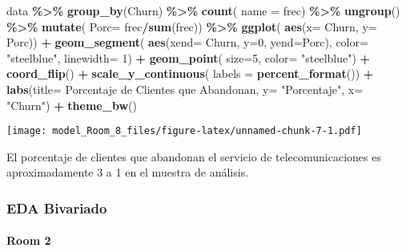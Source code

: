 \documentclass[
]{article}
\newenvironment{Shaded}{\begin{snugshade}}{\end{snugshade}}
\newcommand{\AttributeTok}[1]{\textcolor[rgb]{0.13,0.29,0.53}{#1}}
\newcommand{\DecValTok}[1]{\textcolor[rgb]{0.00,0.00,0.81}{#1}}
\newcommand{\FunctionTok}[1]{\textcolor[rgb]{0.13,0.29,0.53}{\textbf{#1}}}
\newcommand{\NormalTok}[1]{#1}
\newcommand{\SpecialCharTok}[1]{\textcolor[rgb]{0.81,0.36,0.00}{\textbf{#1}}}
\newcommand{\StringTok}[1]{\textcolor[rgb]{0.31,0.60,0.02}{#1}}
\begin{document}
\begin{Shaded}
\begin{Highlighting}[]
\NormalTok{data }\SpecialCharTok{\%\textgreater{}\%}
\FunctionTok{group\_by}\NormalTok{(Churn) }\SpecialCharTok{\%\textgreater{}\%}
\FunctionTok{count}\NormalTok{( }\AttributeTok{name =} \StringTok{\textquotesingle{}frec\textquotesingle{}}\NormalTok{) }\SpecialCharTok{\%\textgreater{}\%}
\FunctionTok{ungroup}\NormalTok{() }\SpecialCharTok{\%\textgreater{}\%}
\FunctionTok{mutate}\NormalTok{( }\AttributeTok{Porc=}\NormalTok{ frec}\SpecialCharTok{/}\FunctionTok{sum}\NormalTok{(frec)) }\SpecialCharTok{\%\textgreater{}\%}
\FunctionTok{ggplot}\NormalTok{( }\FunctionTok{aes}\NormalTok{(}\AttributeTok{x=}\NormalTok{ Churn, }\AttributeTok{y=}\NormalTok{ Porc)) }\SpecialCharTok{+}
\FunctionTok{geom\_segment}\NormalTok{( }\FunctionTok{aes}\NormalTok{(}\AttributeTok{xend=}\NormalTok{ Churn, }\AttributeTok{y=}\DecValTok{0}\NormalTok{, }\AttributeTok{yend=}\NormalTok{Porc),}
\AttributeTok{color=} \StringTok{"steelblue"}\NormalTok{, }\AttributeTok{linewidth=} \DecValTok{1}\NormalTok{) }\SpecialCharTok{+}
\FunctionTok{geom\_point}\NormalTok{( }\AttributeTok{size=}\DecValTok{5}\NormalTok{, }\AttributeTok{color=} \StringTok{"steelblue"}\NormalTok{) }\SpecialCharTok{+}
\FunctionTok{coord\_flip}\NormalTok{() }\SpecialCharTok{+}
\FunctionTok{scale\_y\_continuous}\NormalTok{( }\AttributeTok{labels =} \FunctionTok{percent\_format}\NormalTok{()) }\SpecialCharTok{+}
\FunctionTok{labs}\NormalTok{(}\AttributeTok{title=} \StringTok{\textquotesingle{}Porcentaje de Clientes que Abandonan\textquotesingle{}}\NormalTok{,}
\AttributeTok{y=} \StringTok{"Porcentaje"}\NormalTok{, }\AttributeTok{x=} \StringTok{"Churn"}\NormalTok{) }\SpecialCharTok{+}
\FunctionTok{theme\_bw}\NormalTok{()}
\end{Highlighting}
\end{Shaded}

\texttt{[image: model\_Room\_8\_files/figure-latex/unnamed-chunk-7-1.pdf]}

El porcentaje de clientes que abandonan el servicio de
telecomunicaciones es aproximadamente 3 a 1 en el muestra de análisis.

\hypertarget{eda-bivariado}{%
\subsubsection{EDA Bivariado}\label{eda-bivariado}}

\hypertarget{room-2}{%
\paragraph{Room 2}\label{room-2}}
\end{document}
